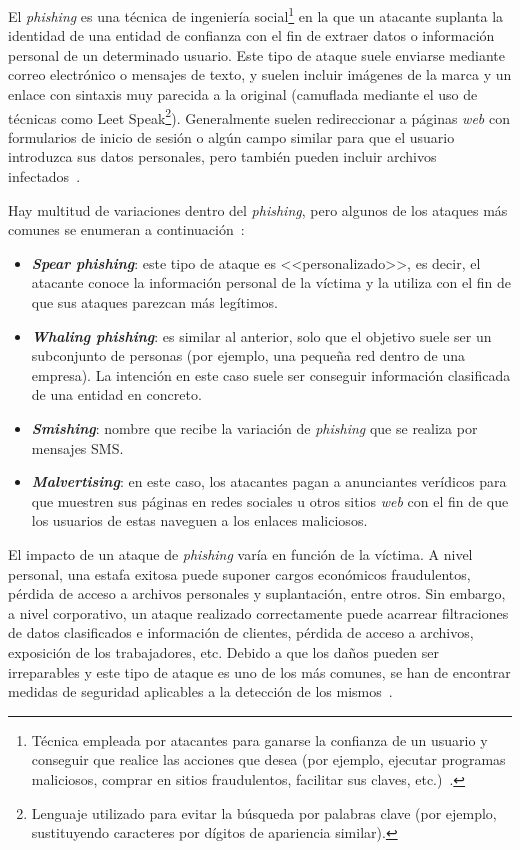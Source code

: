 El \textit{phishing} es una técnica de ingeniería social\footnote{Técnica empleada por atacantes para ganarse la confianza de un usuario y conseguir que realice las acciones que desea (por ejemplo, ejecutar programas maliciosos, comprar en sitios fraudulentos, facilitar sus claves, etc.)~\cite{ingenieriaSocialINCIBE}.} en la que un atacante suplanta la identidad de una entidad de confianza con el fin de extraer datos o información personal de un determinado usuario. Este tipo de ataque suele enviarse mediante correo electrónico o mensajes de texto, y suelen incluir imágenes de la marca y un enlace con sintaxis muy parecida a la original (camuflada mediante el uso de técnicas como Leet Speak\footnote{Lenguaje utilizado para evitar la búsqueda por palabras clave (por ejemplo, sustituyendo caracteres por dígitos de apariencia similar).}). Generalmente suelen redireccionar a páginas \textit{web} con formularios de inicio de sesión o algún campo similar para que el usuario introduzca sus datos personales, pero también pueden incluir archivos infectados~\cite{phishingBBVA}.

Hay multitud de variaciones dentro del \textit{phishing}, pero algunos de los ataques más comunes se enumeran a continuación~\cite{phishingKeeperSecurity}: 

\begin{itemize}
	\item \textbf{\textit{Spear phishing}}: este tipo de ataque es <<personalizado>>, es decir, el atacante conoce la información personal de la víctima y la utiliza con el fin de que sus ataques parezcan más legítimos.
	
	\item \textbf{\textit{Whaling phishing}}: es similar al anterior, solo que el objetivo suele ser un subconjunto de personas (por ejemplo, una pequeña red dentro de una empresa). La intención en este caso suele ser conseguir información clasificada de una entidad en concreto.
	\item \textbf{\textit{Smishing}}: nombre que recibe la variación de \textit{phishing} que se realiza por mensajes SMS.
	\item \textbf{\textit{Malvertising}}: en este caso, los atacantes pagan a anunciantes verídicos para que muestren sus páginas en redes sociales u otros sitios \textit{web} con el fin de que los usuarios de estas naveguen a los enlaces maliciosos.
\end{itemize}

El impacto de un ataque de \textit{phishing} varía en función de la víctima. A nivel personal, una estafa exitosa puede suponer cargos económicos fraudulentos, pérdida de acceso a archivos personales y suplantación, entre otros. Sin embargo, a nivel corporativo, un ataque realizado correctamente puede acarrear filtraciones de datos clasificados e información de clientes, pérdida de acceso a archivos, exposición de los trabajadores, etc. Debido a que los daños pueden ser irreparables y este tipo de ataque es uno de los más comunes, se han de encontrar medidas de seguridad aplicables a la detección de los mismos~\cite{phishingMicrosoft}.

